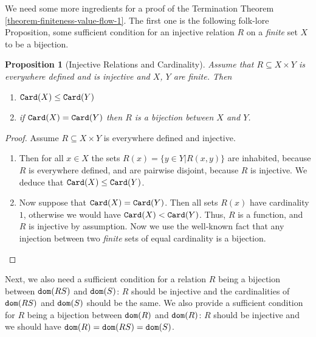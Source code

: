 \documentclass{lmcs}
\newtheorem{proposition}[theorem]{Proposition}
\begin{document}
We need some more ingredients for a proof of the Termination 
Theorem \ref{theorem-finiteness-value-flow-1}. 
The first one is the following folk-lore Proposition, some sufficient condition
for an injective relation $R$ on a \emph{finite} set $X$ to be a bijection.


\begin{proposition}[Injective Relations and Cardinality]
\label{proposition-injective-relation}
Assume that $R \subseteq X \times Y$ is \emph{everywhere defined} 
and is \emph{injective} and $X$, $Y$ are finite. Then 
\begin{enumerate}
\item
\label{proposition-injective-relation-01}
${\tt Card}(X) \le {\tt Card}(Y)$

\item  
\label{proposition-injective-relation-02}
if ${\tt Card}(X)={\tt Card}(Y)$
then $R$ is a bijection between $X$ and $Y$.
\end{enumerate}
\end{proposition}

\begin{proof}
Assume $R \subseteq X \times Y$ is everywhere defined and injective. 
\begin{enumerate}
\item
Then
for all $x \in X$ the sets $R(x) = \{ y \in Y | R(x,y) \}$ are inhabited,
because $R$ is everywhere defined, and are pairwise disjoint,
because $R$ is injective.
We deduce that ${\tt Card}(X) \le {\tt Card}(Y)$.

\item
Now suppose that ${\tt Card}(X) = {\tt Card}(Y)$.
Then all sets $R(x)$ have cardinality $1$, 
otherwise we would have ${\tt Card}(X)<{\tt Card}(Y)$. 
Thus, $R$ is a function, and $R$ is injective by assumption. 
Now we use the well-known fact that any injection
between two \emph{finite} sets of equal cardinality is a bijection.
\end{enumerate}
\end{proof}


Next, we also need a sufficient condition for a relation $R$ being
a bijection between ${\tt dom}(RS)$ and ${\tt dom}(S)$: $R$ should be injective
and the cardinalities of ${\tt dom}(RS)$ and ${\tt dom}(S)$ should be the same.
We also provide a sufficient condition for $R$ being
a bijection between ${\tt dom}(R)$ and ${\tt dom}(R)$:
$R$ should be injective and we should have ${\tt dom}(R)={\tt dom}(RS)={\tt dom}(S)$.
\end{document}

